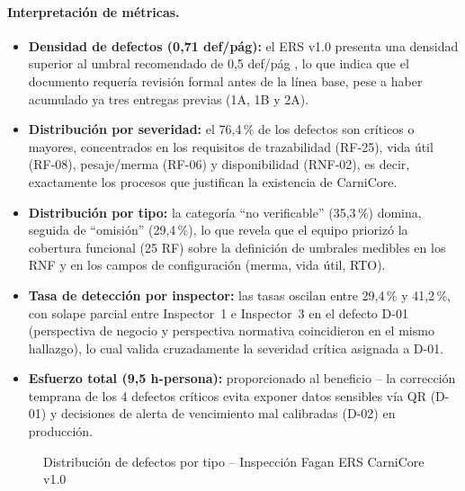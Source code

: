 \documentclass[11pt,a4paper]{article}
\begin{document}
\paragraph{Interpretación de métricas.}
\begin{itemize}[nosep]
\item \textbf{Densidad de defectos (0,71 def/pág):} el ERS v1.0 presenta una densidad superior al umbral recomendado de 0,5 def/pág \cite{fagan1976}, lo que indica que el documento requería revisión formal antes de la línea base, pese a haber acumulado ya tres entregas previas (1A, 1B y 2A).
\item \textbf{Distribución por severidad:} el 76,4\,\% de los defectos son críticos o mayores, concentrados en los requisitos de trazabilidad (RF-25), vida útil (RF-08), pesaje/merma (RF-06) y disponibilidad (RNF-02), es decir, exactamente los procesos que justifican la existencia de CarniCore.
\item \textbf{Distribución por tipo:} la categoría “no verificable” (35,3\,\%) domina, seguida de “omisión” (29,4\,\%), lo que revela que el equipo priorizó la cobertura funcional (25 RF) sobre la definición de umbrales medibles en los RNF y en los campos de configuración (merma, vida útil, RTO).
\item \textbf{Tasa de detección por inspector:} las tasas oscilan entre 29,4\,\% y 41,2\,\%, con solape parcial entre Inspector~1 e Inspector~3 en el defecto D-01 (perspectiva de negocio y perspectiva normativa coincidieron en el mismo hallazgo), lo cual valida cruzadamente la severidad crítica asignada a D-01.
\item \textbf{Esfuerzo total (9,5 h-persona):} proporcionado al beneficio -- la corrección temprana de los 4 defectos críticos evita exponer datos sensibles vía QR (D-01) y decisiones de alerta de vencimiento mal calibradas (D-02) en producción.
\end{itemize}

\begin{figure}[H]
\centering
{}
\caption{Distribución de defectos por tipo -- Inspección Fagan ERS CarniCore v1.0}
\end{figure}
\end{document}
